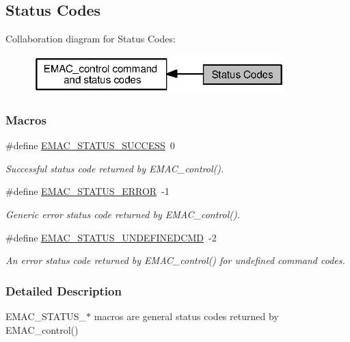 \subsection{Status Codes}
\label{group___e_m_a_c___s_t_a_t_u_s}
Collaboration diagram for Status Codes\+:
\nopagebreak
\begin{figure}[H]
\begin{center}
\leavevmode
\includegraphics[width=277pt]{group___e_m_a_c___s_t_a_t_u_s}
\end{center}
\end{figure}
\subsubsection*{Macros}
\begin{DoxyCompactItemize}
\item 
\#define \hyperlink{group___e_m_a_c___s_t_a_t_u_s_ga335affc31a69a1af1f5ea215936d60f7}{E\+M\+A\+C\+\_\+\+S\+T\+A\+T\+U\+S\+\_\+\+S\+U\+C\+C\+E\+S\+S}~0
\begin{DoxyCompactList}\small\item\em Successful status code returned by E\+M\+A\+C\+\_\+control(). \end{DoxyCompactList}\item 
\#define \hyperlink{group___e_m_a_c___s_t_a_t_u_s_gac1c4139ae6d9551aa60f3af3ea6fc519}{E\+M\+A\+C\+\_\+\+S\+T\+A\+T\+U\+S\+\_\+\+E\+R\+R\+O\+R}~-\/1
\begin{DoxyCompactList}\small\item\em Generic error status code returned by E\+M\+A\+C\+\_\+control(). \end{DoxyCompactList}\item 
\#define \hyperlink{group___e_m_a_c___s_t_a_t_u_s_gade69656b299f95b8286b4d39e6ee10da}{E\+M\+A\+C\+\_\+\+S\+T\+A\+T\+U\+S\+\_\+\+U\+N\+D\+E\+F\+I\+N\+E\+D\+C\+M\+D}~-\/2
\begin{DoxyCompactList}\small\item\em An error status code returned by E\+M\+A\+C\+\_\+control() for undefined command codes. \end{DoxyCompactList}\end{DoxyCompactItemize}


\subsubsection{Detailed Description}
E\+M\+A\+C\+\_\+\+S\+T\+A\+T\+U\+S\+\_\+$\ast$ macros are general status codes returned by E\+M\+A\+C\+\_\+control() 

